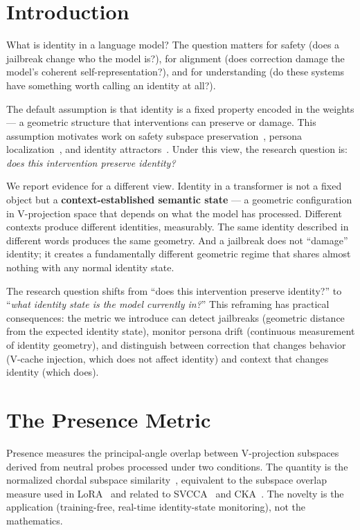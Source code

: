 \documentclass[11pt,a4paper]{article}
\begin{document}
\section{Introduction}
\label{sec:intro}

What is identity in a language model? The question matters for safety
(does a jailbreak change who the model is?), for alignment (does
correction damage the model's coherent self-representation?), and for
understanding (do these systems have something worth calling an identity
at all?).

The default assumption is that identity is a fixed property encoded in the
weights --- a geometric structure that interventions can preserve or damage.
This assumption motivates work on safety subspace
preservation~\citep{zhang2025guardspace}, persona
localization~\citep{cintas2025localizing}, and identity
attractors~\citep{vasilenko2026identity}. Under this view, the research
question is: \emph{does this intervention preserve identity?}

We report evidence for a different view. Identity in a transformer is not
a fixed object but a \textbf{context-established semantic state} ---
a geometric configuration in V-projection space that depends on what the
model has processed. Different contexts produce different identities,
measurably. The same identity described in different words produces the
same geometry. And a jailbreak does not ``damage'' identity; it creates
a fundamentally different geometric regime that shares almost nothing with
any normal identity state.

The research question shifts from ``does this intervention preserve
identity?'' to ``\emph{what identity state is the model currently in?}''
This reframing has practical consequences: the metric we introduce can
detect jailbreaks (geometric distance from the expected identity state),
monitor persona drift (continuous measurement of identity geometry), and
distinguish between correction that changes behavior (V-cache injection,
which does not affect identity) and context that changes identity (which
does).

\section{The Presence Metric}
\label{sec:method}

Presence measures the principal-angle overlap between V-projection
subspaces derived from neutral probes processed under two conditions.
The quantity is the normalized chordal subspace
similarity~\citep{bjorck1973numerical}, equivalent to the subspace overlap
measure used in LoRA~\citep{hu2021lora} and related to
SVCCA~\citep{raghu2017svcca} and CKA~\citep{kornblith2019similarity}.
The novelty is the application (training-free, real-time
identity-state monitoring), not the mathematics.
\end{document}
